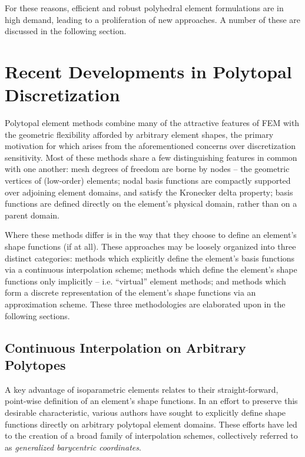 	For these reasons, efficient and robust polyhedral element formulations are in high demand, leading to a proliferation of new approaches. A number of these are discussed in the following section.

\section{Recent Developments in Polytopal Discretization} %

	Polytopal element methods combine many of the attractive features of FEM with the geometric flexibility afforded by arbitrary element shapes, the primary motivation for which arises from the aforementioned concerns over discretization sensitivity. Most of these methods share a few distinguishing features in common with one another: mesh degrees of freedom are borne by nodes -- the geometric vertices of (low-order) elements; nodal basis functions are compactly supported over adjoining element domains, and satisfy the Kronecker delta property; basis functions are defined directly on the element's physical domain, rather than on a parent domain.
	
	
	Where these methods differ is in the way that they choose to define an element's shape functions (if at all). These approaches may be loosely organized into three distinct categories: methods which explicitly define the element's basis functions via a continuous interpolation scheme; methods which define the element's shape functions only implicitly -- i.e. ``virtual'' element methods; and methods which form a discrete representation of the element's shape functions via an approximation scheme. These three methodologies are elaborated upon in the following sections.

	\subsection*{Continuous Interpolation on Arbitrary Polytopes}
		A key advantage of isoparametric elements relates to their straight-forward, point-wise definition of an element's shape functions. In an effort to preserve this desirable characteristic, various authors have sought to explicitly define shape functions directly on arbitrary polytopal element domains. These efforts have led to the creation of a broad family of interpolation schemes, collectively referred to as \textit{generalized barycentric coordinates}.
		
